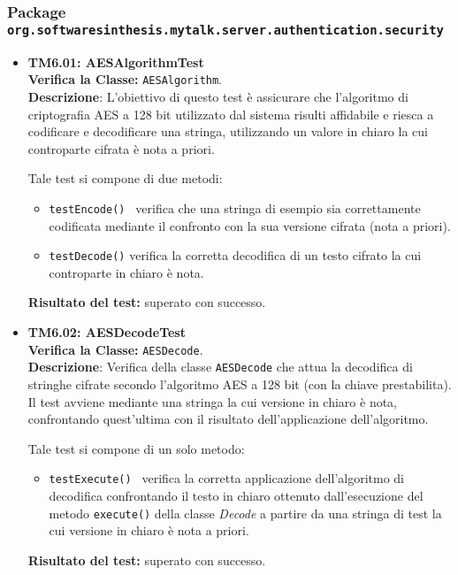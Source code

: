 \subsubsection{Package \texttt{org.softwaresinthesis.mytalk.server.authentication.security}}
\begin{itemize}

\item \textbf{TM6.01: AESAlgorithmTest}\\
\textbf{Verifica la Classe:} \texttt{AESAlgorithm}.\\
\textbf{Descrizione}: L'obiettivo di questo test è assicurare che l'algoritmo di criptografia AES a 128 bit utilizzato dal sistema \caName{} risulti affidabile e riesca a codificare e decodificare una stringa, utilizzando un valore in chiaro la cui controparte cifrata è nota a priori.

Tale test si compone di due metodi:
\begin{itemize}
\item \texttt{testEncode() } verifica che una stringa di esempio sia correttamente codificata mediante il confronto con la sua versione cifrata (nota a priori).

\item \texttt{testDecode()} verifica la corretta decodifica di un testo cifrato la cui controparte in chiaro è nota.
\end{itemize}
\textbf{Risultato del test:} superato con successo.


\item \textbf{TM6.02: AESDecodeTest}\\
\textbf{Verifica la Classe:} \texttt{AESDecode}.\\
\textbf{Descrizione}: Verifica della classe \texttt{AESDecode} che attua la decodifica di stringhe cifrate secondo l'algoritmo AES a 128 bit (con la chiave prestabilita). Il test avviene mediante una stringa la cui versione in chiaro è nota, confrontando quest'ultima con il risultato dell'applicazione dell'algoritmo.

Tale test si compone di un solo metodo:
\begin{itemize}
\item \texttt{testExecute() } verifica la corretta applicazione dell'algoritmo di decodifica confrontando il testo in chiaro ottenuto dall'esecuzione del metodo \texttt{execute()} della classe \textit{Decode} a partire da una stringa di test la cui versione in chiaro è nota a priori.
\end{itemize}
\textbf{Risultato del test:} superato con successo.



\end{itemize}

